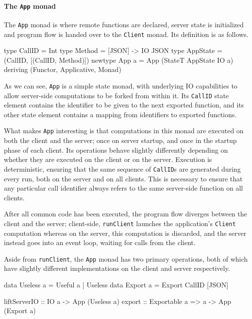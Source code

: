\documentclass[preprint]{sigplanconf}
\begin{document}
\paragraph{The \lstinline!App! monad}
The \lstinline!App! monad is where remote functions are declared, server state
is initialized and program flow is handed over to the \lstinline!Client! monad.
Its definition is as follows.

\begin{code}
type CallID = Int
type Method = [JSON] -> IO JSON
type AppState = (CallID, [(CallID, Method)])
newtype App a = App (StateT AppState IO a)
  deriving (Functor, Applicative, Monad)
\end{code}

As we can see, \lstinline!App! is a simple state monad, with underlying IO
capabilities to allow server-side computations to be forked from within it.
Its \lstinline!CallID! state element contains the identifier to be given to the
next exported function, and its other state element contains a mapping from
identifiers to exported functions.

What makes \lstinline!App! interesting is that computations in this monad are
executed on both the client and the server; once on server startup, and once
in the startup phase of each client. Its operations behave slightly differently
depending on whether they are executed on the client or on the server.
Execution is deterministic, ensuring that the same sequence of
\lstinline!CallID!s are generated during every run, both on the server and on
all clients. This is necessary to ensure that any particular call identifier
always refers to the same server-side function on all clients.

After all common code has been executed, the program flow diverges between the
client and the server; client-side, \lstinline!runClient! launches the
application's \lstinline!Client! computation whereas on the server, this
computation is discarded, and the server instead goes into an event loop,
waiting for calls from the client.

Aside from \lstinline!runClient!, the \lstinline!App! monad has two primary
operations, both of which have slightly different implementations on the client
and server respectively.

\begin{code}
data Useless a = Useful a | Useless
data Export a = Export CallID [JSON]

liftServerIO :: IO a -> App (Useless a)
export :: Exportable a => a -> App (Export a)
\end{code}
\end{document}
